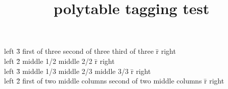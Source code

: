 \documentclass{article}
\title{polytable tagging test}
\begin{document}
\begin{ptboxed}
\> left
\=3 first of three \> second of three \> third of three
\=r right \\
\> left \=2 middle 1/2 \> middle 2/2 \=r right \\
\> left \=3 middle 1/3 \> middle 2/3 \> middle 3/3 \=r right \\
\> left
\=2 first of two middle columns \> second of two middle columns
\=r right \\
\end{ptboxed}
\end{document}

